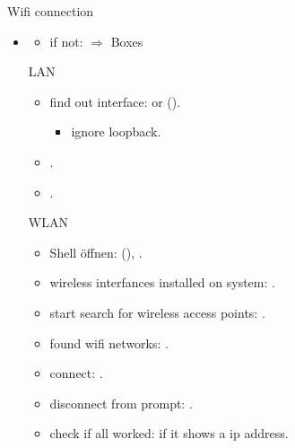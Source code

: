 \begin{frame}{Wifi connection\vspace{0.25cm}}
  \begin{itemize}
    \item {}
    \begin{itemize}
      \item \alert{if not:} $\Rightarrow$ Boxes
    \end{itemize}
    \begin{block}{LAN}
      \begin{itemize}
        \item \alert{find out interface:}  or  ().
          \begin{itemize}
            \item ignore loopback.
          \end{itemize}
        \item {}.
        \item {}.
      \end{itemize}
    \end{block}
    \begin{block}{WLAN}
      \begin{itemize}
        \item Shell öffnen:  (), .
        \item \alert{wireless interfances installed on system:} .
        \item \alert{start search for wireless access points:} {\tiny {}}.
        \item \alert{found wifi networks:} {\tiny{}.}
        \item \alert{connect:} {\tiny {}.}
        \item \alert{disconnect from prompt:} .
        \item \alert{check if all worked:}  if it shows a ip address.
      \end{itemize}
    \end{block}
  \end{itemize}

\end{frame}
